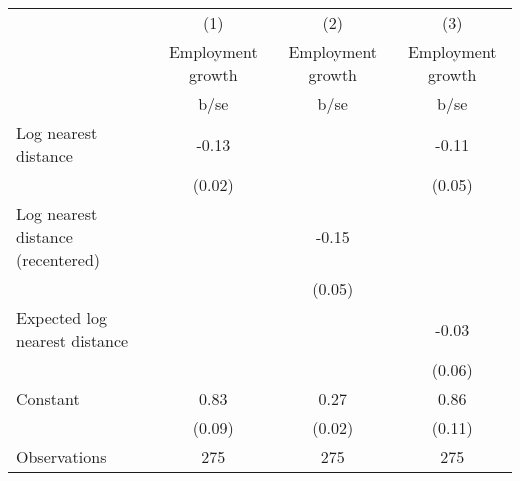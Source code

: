 {
\def\sym#1{\ifmmode^{#1}\else\(^{#1}\)\fi}
\begin{tabular}{l*{3}{c}}
\hline\hline
                                                  &\multicolumn{1}{c}{(1)}&\multicolumn{1}{c}{(2)}&\multicolumn{1}{c}{(3)}\\
                                                  &\multicolumn{1}{c}{Employment growth}&\multicolumn{1}{c}{Employment growth}&\multicolumn{1}{c}{Employment growth}\\
                                                  &        b/se&        b/se&        b/se\\
\hline
Log nearest distance                              &       -0.13&            &       -0.11\\
                                                  &      (0.02)&            &      (0.05)\\
Log nearest distance (recentered)                 &            &       -0.15&            \\
                                                  &            &      (0.05)&            \\
Expected log nearest distance                     &            &            &       -0.03\\
                                                  &            &            &      (0.06)\\
Constant                                          &        0.83&        0.27&        0.86\\
                                                  &      (0.09)&      (0.02)&      (0.11)\\
\hline
Observations                                      &         275&         275&         275\\
\hline\hline
\end{tabular}
}
